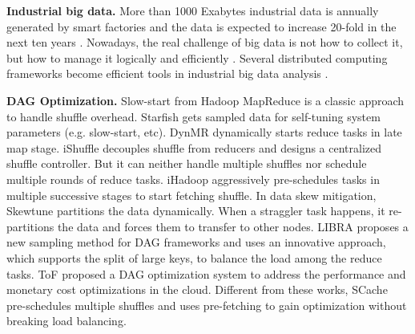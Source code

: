 {\textbf{Industrial big data.}
More than 1000 Exabytes industrial data is annually generated by smart factories and the data is expected to increase 20-fold in the next ten years \cite{yin2015big}.
Nowadays, the real challenge of big data is not how to collect it, but how to manage it logically and efficiently \cite{lv2017next}.
Several distributed computing frameworks become efficient tools in industrial big data analysis \cite{lade2017manufacturing, li2016scientific, ur2018big}.
}

{\color{black}
\textbf{DAG Optimization.} 
Slow-start from Hadoop MapReduce is a classic approach to handle shuffle overhead. 
Starfish \cite{starfish} gets sampled data  for self-tuning system parameters (e.g. slow-start, etc). 
DynMR \cite{dynmr} dynamically starts reduce tasks in late map stage. 
iShuffle \cite{guo2017ishuffle} decouples shuffle from reducers and designs a centralized shuffle controller. 
But it can neither handle multiple shuffles nor schedule multiple rounds of reduce tasks. 
iHadoop \cite{ihadoop} aggressively pre-schedules tasks in multiple successive stages to start fetching shuffle. 
In data skew mitigation, 
Skewtune \cite{skewtune} partitions the data dynamically. When a straggler task happens, it re-partitions the data and forces them to transfer to other nodes.
LIBRA \cite{chen2014libra} proposes a new sampling method for DAG frameworks and uses an innovative approach, which supports the split of large keys, to balance the load among the reduce tasks.
ToF \cite{zhou2014transformation} proposed a DAG optimization system to address the performance and monetary cost optimizations in the cloud.
Different from these works, SCache pre-schedules multiple shuffles and uses pre-fetching to gain optimization without breaking load balancing. 
}
